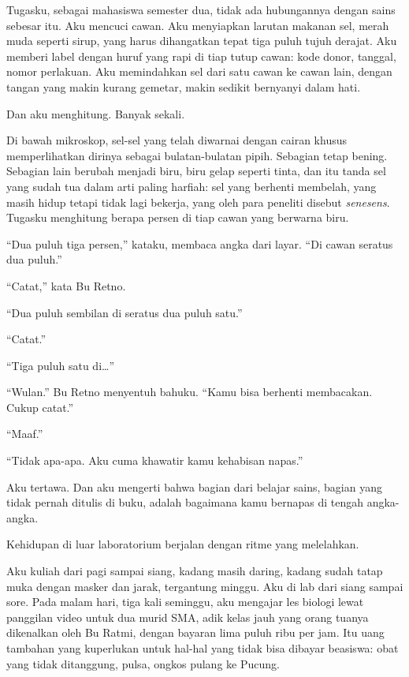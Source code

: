 \documentclass[11pt,twoside,openany]{book}
\makeatletter
\newcommand{\scenebreak}{\par\vspace{0.9em}{\centering\textsc{*\hspace{0.7em}*\hspace{0.7em}*}\par}\vspace{0.9em}\@afterindentfalse\@afterheading}
\makeatother
\begin{document}
Tugasku, sebagai mahasiswa semester dua, tidak ada hubungannya dengan sains sebesar itu. Aku mencuci cawan. Aku menyiapkan larutan makanan sel, merah muda seperti sirup, yang harus dihangatkan tepat tiga puluh tujuh derajat. Aku memberi label dengan huruf yang rapi di tiap tutup cawan: kode donor, tanggal, nomor perlakuan. Aku memindahkan sel dari satu cawan ke cawan lain, dengan tangan yang makin kurang gemetar, makin sedikit bernyanyi dalam hati.

Dan aku menghitung. Banyak sekali.

Di bawah mikroskop, sel-sel yang telah diwarnai dengan cairan khusus memperlihatkan dirinya sebagai bulatan-bulatan pipih. Sebagian tetap bening. Sebagian lain berubah menjadi biru, biru gelap seperti tinta, dan itu tanda sel yang sudah tua dalam arti paling harfiah: sel yang berhenti membelah, yang masih hidup tetapi tidak lagi bekerja, yang oleh para peneliti disebut \emph{senesens}. Tugasku menghitung berapa persen di tiap cawan yang berwarna biru.

``Dua puluh tiga persen,'' kataku, membaca angka dari layar. ``Di cawan seratus dua puluh.''

``Catat,'' kata Bu Retno.

``Dua puluh sembilan di seratus dua puluh satu.''

``Catat.''

``Tiga puluh satu di\ldots{}''

``Wulan.'' Bu Retno menyentuh bahuku. ``Kamu bisa berhenti membacakan. Cukup catat.''

``Maaf.''

``Tidak apa-apa. Aku cuma khawatir kamu kehabisan napas.''

Aku tertawa. Dan aku mengerti bahwa bagian dari belajar sains, bagian yang tidak pernah ditulis di buku, adalah bagaimana kamu bernapas di tengah angka-angka.

\scenebreak
Kehidupan di luar laboratorium berjalan dengan ritme yang melelahkan.

Aku kuliah dari pagi sampai siang, kadang masih daring, kadang sudah tatap muka dengan masker dan jarak, tergantung minggu. Aku di lab dari siang sampai sore. Pada malam hari, tiga kali seminggu, aku mengajar les biologi lewat panggilan video untuk dua murid SMA, adik kelas jauh yang orang tuanya dikenalkan oleh Bu Ratmi, dengan bayaran lima puluh ribu per jam. Itu uang tambahan yang kuperlukan untuk hal-hal yang tidak bisa dibayar beasiswa: obat yang tidak ditanggung, pulsa, ongkos pulang ke Pucung.
\end{document}
